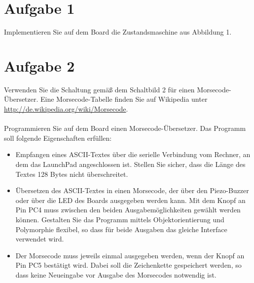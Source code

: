 \section{Aufgabe 1}
Implementieren Sie auf dem Board die Zustandsmaschine aus Abbildung 1.\\
\section{Aufgabe 2}
Verwenden Sie die Schaltung gemä\ss{} dem Schaltbild 2 für einen Morsecode-Übersetzer. Eine Morsecode-Tabelle finden Sie auf Wikipedia unter \url{http://de.wikipedia.org/wiki/Morsecode}.\\ \\
Programmieren Sie auf dem Board einen Morsecode-Übersetzer. Das Programm soll folgende Eigenschaften erfüllen:\\
\begin{itemize}
	\item Empfangen eines ASCII-Textes über die serielle Verbindung vom Rechner, an dem das LaunchPad angeschlossen ist. Stellen Sie sicher, dass die Länge des Textes 128 Bytes nicht überschreitet.
	\item Übersetzen des ASCII-Textes in einen Morsecode, der über den Piezo-Buzzer oder über die LED des Boards ausgegeben werden kann. Mit dem Knopf an Pin PC4 muss zwischen den beiden Ausgabemöglichkeiten gewählt werden können. Gestalten Sie das Programm mittels Objektorientierung und Polymorphie flexibel, so dass für beide Ausgaben das gleiche Interface verwendet wird.
	\item Der Morsecode muss jeweils einmal ausgegeben werden, wenn der Knopf an Pin PC5 bestätigt wird. Dabei soll die Zeichenkette gespeichert werden, so dass keine Neueingabe vor Ausgabe des Morsecodes notwendig ist.
\end{itemize}

